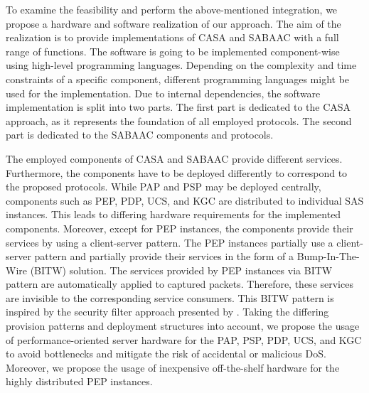 To examine the feasibility and perform the above-mentioned integration, we propose a hardware and software realization of our approach.
The aim of the realization is to provide implementations of CASA and SABAAC with a full range of functions.
The software is going to be implemented component-wise using high-level programming languages.
Depending on the complexity and time constraints of a specific component, different programming languages might be used for the implementation.
Due to internal dependencies, the software implementation is split into two parts.
The first part is dedicated to the CASA approach, as it represents the foundation of all employed protocols.
The second part is dedicated to the SABAAC components and protocols.

The employed components of CASA and SABAAC provide different services.
Furthermore, the components have to be deployed differently to correspond to the proposed protocols.
While PAP and PSP may be deployed centrally, components such as PEP, PDP, UCS, and KGC are distributed to individual SAS instances.
This leads to differing hardware requirements for the implemented components.
Moreover, except for PEP instances, the components provide their services by using a client-server pattern.
The PEP instances partially use a client-server pattern and partially provide their services in the form of a Bump-In-The-Wire (BITW) solution.
The services provided by PEP instances via BITW pattern are automatically applied to captured packets.
Therefore, these services are invisible to the corresponding service consumers.
This BITW pattern is inspired by the security filter approach presented by \citeauthor{Ishchenko2018} \cite{Ishchenko2018}.
Taking the differing provision patterns and deployment structures into account, we propose the usage of performance-oriented server hardware for the PAP, PSP, PDP, UCS, and KGC to avoid bottlenecks and mitigate the risk of accidental or malicious DoS.
Moreover, we propose the usage of inexpensive off-the-shelf hardware for the highly distributed PEP instances.

